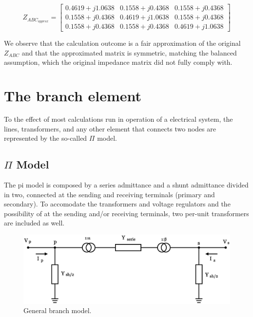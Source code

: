 \documentclass{tufte-book}
\begin{document}
$$
Z_{ABC_{approx}} = \left[ \begin{array}{ccc}
0.4619 + j1.0638 & 0.1558 + j0.4368 & 0.1558 + j0.4368 \\
0.1558 + j0.4368 & 0.4619 + j1.0638 & 0.1558 + j0.4368 \\ 
0.1558 + j0.4368 & 0.1558 + j0.4368 & 0.4619 + j1.0638
\end{array} \right]
$$

We observe that the calculation outcome is a fair approximation of the original $Z_{ABC}$ and that the approximated matrix is symmetric, matching the balanced assumption, which the original impedance matrix did not fully comply with. 

\chapter{The branch element}

To the effect of most calculations run in operation of a electrical system, the lines, transformers, and any other element that connects two nodes are represented by the so-called $\Pi$ model.


\section{$\Pi$ Model}


The pi model is composed by a series admittance and a shunt admittance divided in two, connected at the sending and receiving terminals (primary and secondary). To accomodate the transformers and voltage regulators and the possibility of at the sending and/or receiving terminals, two per-unit transformers are included as well.


\begin{center}
	\begin{figure}[h]
		\includegraphics[width=0.6\linewidth]{img/Branch.eps}
		\caption{General branch model.}
		\label{pi_model}
	\end{figure}
\end{center}
\end{document}
